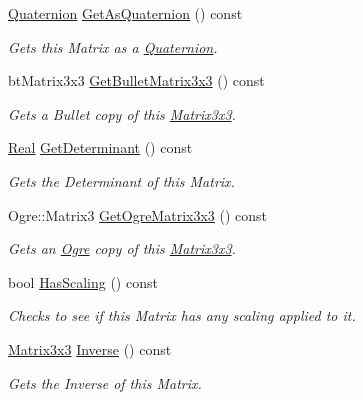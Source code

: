 \begin{DoxyCompactItemize}
\hyperlink{classMezzanine_1_1Quaternion}{Quaternion} \hyperlink{classMezzanine_1_1Matrix3x3_a1ce636eda0df028760bc1b3c34d11464}{GetAsQuaternion} () const 
\begin{DoxyCompactList}\small\item\em Gets this Matrix as a \hyperlink{classMezzanine_1_1Quaternion}{Quaternion}. \item\end{DoxyCompactList}\item 
btMatrix3x3 \hyperlink{classMezzanine_1_1Matrix3x3_aeb62e9d30cdbb5298614bf66ab451f5d}{GetBulletMatrix3x3} () const 
\begin{DoxyCompactList}\small\item\em Gets a Bullet copy of this \hyperlink{classMezzanine_1_1Matrix3x3}{Matrix3x3}. \item\end{DoxyCompactList}\item 
\hyperlink{namespaceMezzanine_a726731b1a7df72bf3583e4a97282c6f6}{Real} \hyperlink{classMezzanine_1_1Matrix3x3_a607190f3469f567ca4a0e15d9ca72314}{GetDeterminant} () const 
\begin{DoxyCompactList}\small\item\em Gets the Determinant of this Matrix. \item\end{DoxyCompactList}\item 
Ogre::Matrix3 \hyperlink{classMezzanine_1_1Matrix3x3_a9a5caf60bf0353e6e12fce499494985e}{GetOgreMatrix3x3} () const 
\begin{DoxyCompactList}\small\item\em Gets an \hyperlink{namespaceOgre}{Ogre} copy of this \hyperlink{classMezzanine_1_1Matrix3x3}{Matrix3x3}. \item\end{DoxyCompactList}\item 
bool \hyperlink{classMezzanine_1_1Matrix3x3_ad4ac05ea5540262b8f64a5c1b7b9c7e8}{HasScaling} () const 
\begin{DoxyCompactList}\small\item\em Checks to see if this Matrix has any scaling applied to it. \item\end{DoxyCompactList}\item 
\hyperlink{classMezzanine_1_1Matrix3x3}{Matrix3x3} \hyperlink{classMezzanine_1_1Matrix3x3_a3d8a0a206257803648f7014af73de36b}{Inverse} () const 
\begin{DoxyCompactList}\small\item\em Gets the Inverse of this Matrix. \item\end{DoxyCompactList}\item 

\end{DoxyCompactItemize}
